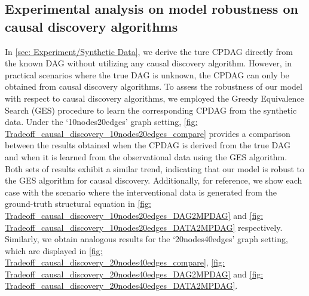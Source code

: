 \documentclass{article} %
\begin{document}
\subsection{Experimental analysis on model robustness on causal discovery algorithms} \label{Appendix: Experiment analyzing method robustness on causal discovery algorithm}

In \cref{sec: Experiment/Synthetic Data}, we derive the ture CPDAG directly from the known DAG without utilizing any causal discovery algorithm. However, in practical scenarios where the true DAG is unknown, the CPDAG can only be obtained from causal discovery algorithms. To assess the robustness of our model with respect to causal discovery algorithms, we employed the Greedy Equivalence Search (GES) procedure \cite{chickering2002learning} to learn the corresponding CPDAG from the synthetic data. Under the `10nodes20edges' graph setting, \cref{fig: Tradeoff_causal_discovery_10nodes20edges_compare} provides a comparison between the results obtained when the CPDAG is derived from the true DAG and when it is learned from the observational data using the GES algorithm. Both sets of results exhibit a similar trend, indicating that our model is robust to the GES algorithm for causal discovery. Additionally, for reference, we show each case with the scenario where the interventional data is generated from the ground-truth structural equation in \cref{fig: Tradeoff_causal_discovery_10nodes20edges_DAG2MPDAG} and \cref{fig: Tradeoff_causal_discovery_10nodes20edges_DATA2MPDAG} respectively. Similarly, we obtain analogous results for the `20nodes40edges' graph setting, which are displayed in \cref{fig: Tradeoff_causal_discovery_20nodes40edges_compare}, \cref{fig: Tradeoff_causal_discovery_20nodes40edges_DAG2MPDAG} and \cref{fig: Tradeoff_causal_discovery_20nodes40edges_DATA2MPDAG}. 
\end{document}
